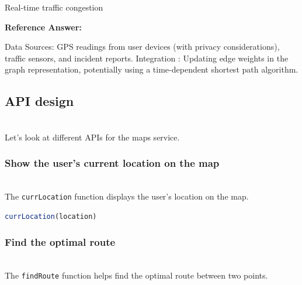 Real-time traffic congestion

\textbf{Reference Answer:}

Data Sources: GPS readings from user devices (with privacy considerations), traffic sensors, and incident reports. Integration : Updating edge weights in the graph representation, potentially using a time-dependent shortest path algorithm.

\subsection{API design}\label{fgOUBIpwT05-vreLNEv1r}
\\
Let's look at different APIs for the maps service.

\subsubsection{Show the user's current location on the map}\label{sscLlOv0RPByPHJO0-TiE}
\\
The \texttt{currLocation} function displays the user's location on the map.

\begin{lstlisting}[language=JavaScript]
currLocation(location)
\end{lstlisting}

\begin{table}[htbp]
\centering
\small
{}
\end{table}

\subsubsection{Find the optimal route}\label{hjk_QwBKxVV82OHrwpDZB}
\\
The \texttt{findRoute} function helps find the optimal route between two points.


